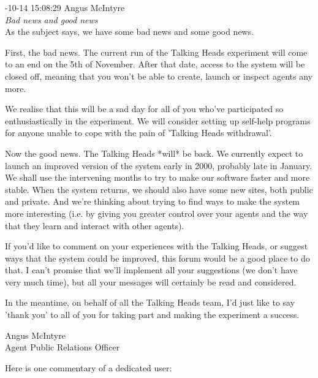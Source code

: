 \begin{mail}
{-10-14 15:08:29 Angus McIntyre}\\
{\itshape Bad news and good news}\\

As the subject says, we have some bad news and some good news.

First, the bad news. The current run of the Talking Heads experiment will come to an end on the 5th of November. After that date, access to the system will be closed off, meaning that you won't be able to create, launch or inspect agents any more.

We realise that this will be a sad day for all of you who've participated so enthusiastically in the experiment. We will consider setting up self-help programs for anyone unable to cope with the pain of 'Talking Heads withdrawal'.

Now the good news. The Talking Heads *will* be back. We currently expect to launch an improved version of the system early in 2000, probably late in January. We shall use the intervening months to try to make our software faster and more stable. When the system returns, we should also have some new sites, both public and private. And we're thinking about trying to find ways to make the system more interesting (i.e. by giving you greater control over your agents and the way that they learn and interact with other agents).

If you'd like to comment on your experiences with the Talking Heads, or suggest ways that the system could be improved, this forum would be a good place to do that. I can't promise that we'll implement all your suggestions (we don't have very much time), but all your messages will certainly be read and considered.

In the meantime, on behalf of all the Talking Heads team, I'd just like to say 'thank you' to all of you for taking part and making the experiment a success.

     Angus McIntyre\\
     Agent Public Relations Officer
\end{mail}

Here is one commentary of a dedicated user: 

